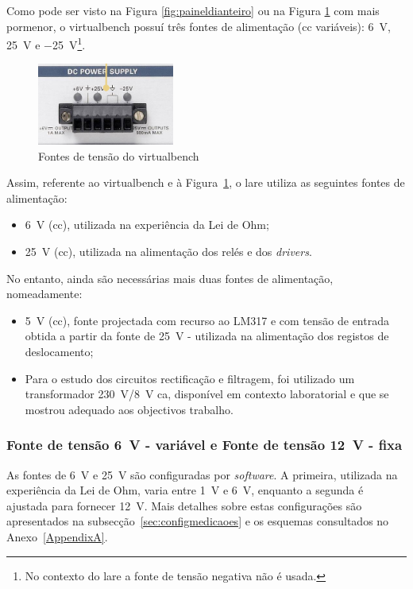 Como pode ser visto na Figura \ref{fig:paineldianteiro} ou na Figura \ref{fig:promenorfontes} com mais pormenor, o \acrshort{virtualbench} possuí três fontes de alimentação (\acrshort{cc} variáveis): \SI{+6}{\volt}, \SI{+25}{\volt} e \SI{-25}{\volt}\footnote{No contexto do \acrshort{lare} a fonte de tensão negativa não é usada.}.

\begin{figure}[hbtp]
	\centering
	\includegraphics[width=0.4\textwidth]{figures/fontes_VB.png}
	\caption{Fontes de tensão do \acrshort{virtualbench}}
	\label{fig:promenorfontes}
\end{figure}

Assim, referente ao \acrshort{virtualbench} e à Figura~\ref{fig:promenorfontes}, o \acrshort{lare} utiliza as seguintes fontes de alimentação:
\begin{itemize}
	\item \SI{6}{\volt} (\acrshort{cc}), utilizada na experiência da Lei de Ohm;
	\item \SI{25}{\volt} (\acrshort{cc}), utilizada na alimentação dos relés e dos \textit{drivers}.
\end{itemize}

No entanto, ainda são necessárias mais duas fontes de alimentação, nomeadamente:
\begin{itemize}
	\item \SI{5}{\volt} (\acrshort{cc}), fonte projectada com recurso ao LM317 e com tensão de entrada obtida a partir da fonte de \SI{25}{\volt} - utilizada na alimentação dos registos de deslocamento;
	\item Para o estudo dos circuitos rectificação e filtragem, foi utilizado um transformador \SI{230}{\volt}/\SI{8}{\volt} \acrshort{ca}, disponível em contexto laboratorial e que se mostrou adequado aos objectivos trabalho.
\end{itemize}

\subsubsection{Fonte de tensão \SI{6}{\volt} - variável e {Fonte de tensão \SI{12}{\volt} - fixa}}
\label{sec:fontes6-12}
As fontes de \SI{6}{\volt} e \SI{25}{\volt} são configuradas por \textit{software}. A primeira, utilizada na experiência da Lei de Ohm, varia entre \SI{1}{\volt} e \SI{6}{\volt}, enquanto a segunda é ajustada para fornecer \SI{12}{\volt}. Mais detalhes sobre estas configurações são apresentados na subsecção~\ref{sec:configmedicaoes} e os esquemas consultados no Anexo~\ref{AppendixA}.

